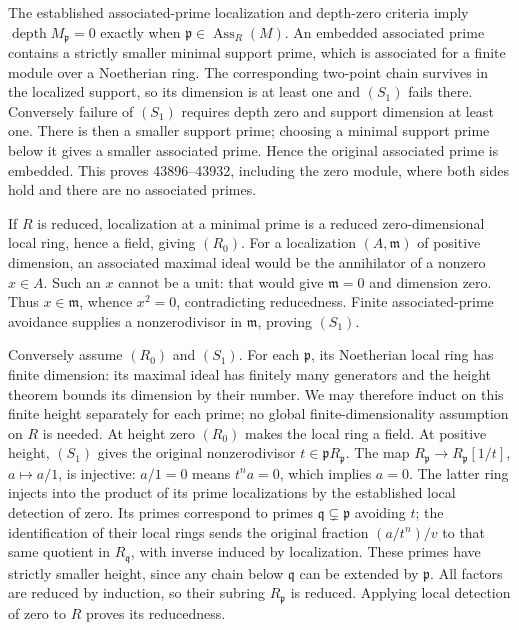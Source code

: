 The established associated-prime localization and depth-zero criteria imply \(\operatorname{depth}M_{\mathfrak p}=0\) exactly when \(\mathfrak p\in\operatorname{Ass}_R(M)\). An embedded associated prime contains a strictly smaller minimal support prime, which is associated for a finite module over a Noetherian ring. The corresponding two-point chain survives in the localized support, so its dimension is at least one and \((S_1)\) fails there. Conversely failure of \((S_1)\) requires depth zero and support dimension at least one. There is then a smaller support prime; choosing a minimal support prime below it gives a smaller associated prime. Hence the original associated prime is embedded. This proves 43896--43932, including the zero module, where both sides hold and there are no associated primes.

If \(R\) is reduced, localization at a minimal prime is a reduced zero-dimensional local ring, hence a field, giving \((R_0)\). For a localization \((A,\mathfrak m)\) of positive dimension, an associated maximal ideal would be the annihilator of a nonzero \(x\in A\). Such an \(x\) cannot be a unit: that would give \(\mathfrak m=0\) and dimension zero. Thus \(x\in\mathfrak m\), whence \(x^2=0\), contradicting reducedness. Finite associated-prime avoidance supplies a nonzerodivisor in \(\mathfrak m\), proving \((S_1)\).

Conversely assume \((R_0)\) and \((S_1)\). For each \(\mathfrak p\), its Noetherian local ring has finite dimension: its maximal ideal has finitely many generators and the height theorem bounds its dimension by their number. We may therefore induct on this finite height separately for each prime; no global finite-dimensionality assumption on \(R\) is needed. At height zero \((R_0)\) makes the local ring a field. At positive height, \((S_1)\) gives the original nonzerodivisor \(t\in\mathfrak pR_{\mathfrak p}\). The map \(R_{\mathfrak p}\to R_{\mathfrak p}[1/t]\), \(a\mapsto a/1\), is injective: \(a/1=0\) means \(t^na=0\), which implies \(a=0\). The latter ring injects into the product of its prime localizations by the established local detection of zero. Its primes correspond to primes \(\mathfrak q\subsetneq\mathfrak p\) avoiding \(t\); the identification of their local rings sends the original fraction \((a/t^n)/v\) to that same quotient in \(R_{\mathfrak q}\), with inverse induced by localization. These primes have strictly smaller height, since any chain below \(\mathfrak q\) can be extended by \(\mathfrak p\). All factors are reduced by induction, so their subring \(R_{\mathfrak p}\) is reduced. Applying local detection of zero to \(R\) proves its reducedness.

